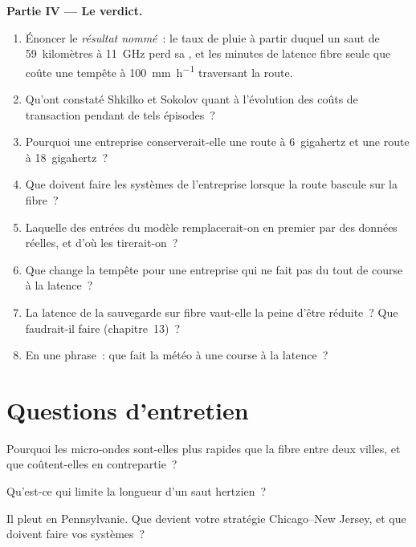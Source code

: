\begin{problem}
\medskip\noindent\textbf{Partie IV --- Le verdict.}
\begin{enumerate}[resume]
\item Énoncer le \emph{résultat nommé}~: le taux de pluie à partir duquel un saut de 59~kilomètres à \qty{11}{\giga\hertz} perd sa , et les minutes de
  latence fibre seule que coûte une tempête à \qty{100}{\milli\metre\per\hour} traversant la route.
\item Qu'ont constaté Shkilko et Sokolov quant à l'évolution des coûts de transaction pendant de tels épisodes~?
\item Pourquoi une entreprise conserverait-elle une route à 6~gigahertz et une route à 18~gigahertz~?
\item Que doivent faire les systèmes de l'entreprise lorsque la route bascule sur la fibre~?
\item Laquelle des entrées du modèle remplacerait-on en premier par des données réelles, et d'où les tirerait-on~?
\item Que change la tempête pour une entreprise qui ne fait pas du tout de course à la latence~?
\item La latence de la sauvegarde sur fibre vaut-elle la peine d'être réduite~? Que faudrait-il faire (chapitre~13)~?
\item En une phrase~: que fait la météo à une course à la latence~?
\end{enumerate}
\end{problem}

\section{Questions d'entretien}

\begin{interviewq}\label{iq:nw:long-haul-wireless:1}
Pourquoi les micro-ondes sont-elles plus rapides que la fibre entre deux villes, et que coûtent-elles en contrepartie~?
\end{interviewq}

\begin{interviewq}\label{iq:nw:long-haul-wireless:2}
Qu'est-ce qui limite la longueur d'un saut hertzien~?
\end{interviewq}

\begin{interviewq}\label{iq:nw:long-haul-wireless:3}
Il pleut en Pennsylvanie. Que devient votre stratégie Chicago--New Jersey, et que doivent faire vos systèmes~?
\end{interviewq}

